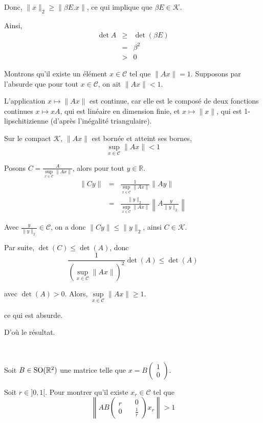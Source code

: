 Donc, $\| x \|_2 \geqslant \| \beta E.x \|$, ce qui implique que $\beta E \in
\mathcal{K}$.

Ainsi,
\begin{eqnarray*}
  \det A & \geqslant & \det (\beta E)\\
  & = & \beta^2\\
  & > & 0
\end{eqnarray*}


Montrons qu'il existe un {\'e}l{\'e}ment $x \in \mathcal{C}$ tel que $\| A x
\| = 1$. Supposons par l'absurde que pour tout $x \in \mathcal{C}$, on ait $\|
A x \| < 1$.

L'application $x \longmapsto \| A x \|$ est continue, car elle est le
compos{\'e} de deux fonctions continues $x \longmapsto x A$, qui est
lin{\'e}aire en dimension finie, et $x \longmapsto \| x \|$, qui est
1-lipschitizienne (d'apr{\`e}s l'in{\'e}galit{\'e} triangulaire).

Sur le compact $\mathcal{K}$, $\| A x \|$ est born{\'e}e et atteint ses
bornes,
\[ \underset{x \in \mathcal{C}}{\sup} \| A x \| < 1 \]


Posons $C = \frac{A}{\underset{x \in \mathcal{C}}{\sup} \| A x \|}$, alors
pour tout $y \in \mathbb{R}$.
\begin{eqnarray*}
  \| C y \| & = & \frac{1}{\underset{x \in \mathcal{C}}{\sup} \| A x \|} \| A
  y \|\\
  & = & \frac{\| y \|_2}{\underset{x \in \mathcal{C}}{\sup} \| A x \|}
  \left\| A \frac{y}{\| y \|_2} \right\|
\end{eqnarray*}


Avec $\frac{y}{\| y \|_2} \in \mathcal{C}$, on a donc $\| C y \| \leqslant \|
y \|_2$, ainsi $C \in \mathcal{K}$.

Par suite, $\det (C) \leqslant \det (A)$, donc
\[ \frac{1}{\left( \underset{x \in \mathcal{C}}{\sup} \| A x \| \right)^2}
   \det (A) \leqslant \det (A) \]


avec $\det (A) > 0$. Alors, $\underset{x \in \mathcal{C}}{\sup} \| A x \|
\geqslant 1$.

ce qui est absurde.

D'o{\`u} le r{\'e}sultat.

\

 Soit $B \in \operatorname{SO} (\mathbb{R}^2)$ une matrice telle que $x
= B \left( \begin{array}{c}
  1\\
  0
\end{array} \right)$.

 Soit $r \in] 0, 1 [$. Pour montrer qu'il existe $x_r \in
\mathcal{C}$ tel que
\[ \left\| A B \left( \begin{array}{c}
     r\\
     0
   \end{array} \quad \begin{array}{c}
     0\\
     \frac{1}{r}
   \end{array} \right) \text{} x_r \right\| > 1 \]


